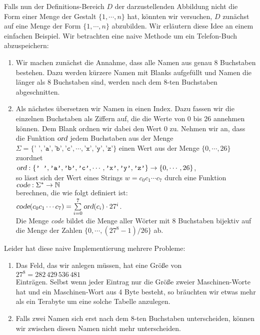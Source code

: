 Falls nun der Definitions-Bereich $D$ der darzustellenden Abbildung nicht die Form einer
Menge der Gestalt $\{1, \cdots, n\}$ hat, 
k\"onnten wir versuchen, $D$ zun\"achst auf eine Menge der Form $\{1,\cdots,n\}$ abzubilden.
Wir erl\"autern diese Idee  an einem einfachen Beispiel.
Wir betrachten eine naive Methode um ein Telefon-Buch abzuspeichern:
\begin{enumerate}
\item Wir machen zun\"achst die Annahme, dass alle Namen aus genau  
      8 Buchstaben bestehen.  Dazu werden
      k\"urzere Namen mit Blanks aufgef\"ullt und Namen die l\"anger als 8 Buchstaben sind,
      werden nach dem  8-ten Buchstaben abgeschnitten.
\item Als n\"achstes \"ubersetzen wir Namen in einen Index.  
      Dazu fassen wir die einzelnen Buchstaben als Ziffern auf, die die Werte von 0 bis 26
      annehmen k\"onnen.  Dem Blank ordnen wir dabei den Wert 0 zu.   Nehmen wir an, dass
      die Funktion $\textsl{ord}$ jedem Buchstaben aus der Menge 
      $\Sigma = \{ \texttt{' '}, \texttt{'a'}, \texttt{'b'}, \texttt{'c'}, \cdots, \texttt{'x'}, \texttt{'y'}, \texttt{'z'} \}$ 
      einen Wert aus der Menge
      $\{0,\cdots,26\}$ zuordnet \\[0.2cm]
      \hspace*{1.3cm} 
      $\textsl{ord}: \{ \texttt{' '}, \texttt{'a'}, \texttt{'b'}, \texttt{'c'}, \cdots, \texttt{'x'}, \texttt{'y'}, \texttt{'z'} \} \rightarrow \{0,\cdots, 26\}$,
      \\[0.2cm]
      so l\"asst sich der Wert eines Strings $w = c_0c_1\cdots c_7$ durch eine Funktion \\[0.2cm]
      \hspace*{1.3cm} 
      $\textsl{code}: \Sigma^* \rightarrow \mathbb{N}$ \\[0.2cm]
      berechnen, die wie folgt definiert ist: \\[0.2cm]
      \hspace*{1.3cm} 
      $\textsl{code}(c_0c_1\cdots c_7) = \sum\limits_{i=0}^7 \textsl{ord}(c_i) \cdot 27^i$.
      \\[0.2cm]
      Die Menge \textsl{code} bildet die Menge aller W\"orter mit 8 Buchstaben bijektiv
      auf die Menge der Zahlen $\{0,\cdots,(27^8 - 1)/26\}$ ab.
\end{enumerate}
Leider hat diese naive Implementierung mehrere Probleme: 
\begin{enumerate}
\item Das Feld, das wir anlegen m\"ussen, hat eine Gr\"o{\ss}e von \\[0.2cm]
      \hspace*{1.3cm} $27^8 = 282\,429\,536\,481$ \\[0.2cm]
      Eintr\"agen.  Selbst wenn jeder Eintrag nur die Gr\"o{\ss}e zweier Maschinen-Worte hat und
      ein Maschinen-Wort aus 4 Byte besteht, so br\"auchten wir 
      etwas mehr als ein Terabyte um eine
      solche Tabelle anzulegen.
\item Falls zwei Namen sich erst nach dem 8-ten Buchstaben unterscheiden, k\"onnen 
      wir zwischen diesen Namen nicht mehr unterscheiden. 
\end{enumerate}
